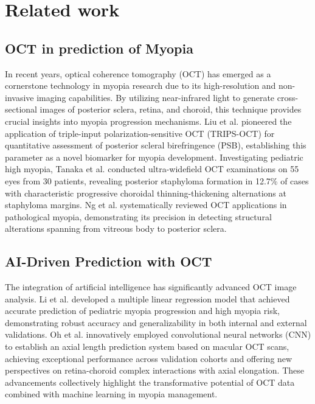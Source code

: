 \documentclass[AMA,Times1COL]{WileyNJDv5} %
\begin{document}
\section{Related work}
\subsection{OCT in prediction of Myopia}
In recent years, optical coherence tomography (OCT) has emerged as a cornerstone technology in myopia research due to its high-resolution and non-invasive imaging capabilities. By utilizing near-infrared light to generate cross-sectional images of posterior sclera, retina, and choroid, this technique provides crucial insights into myopia progression mechanisms\cite{zuo2025machine}. Liu et al. \cite{liu2023posterior} pioneered the application of triple-input polarization-sensitive OCT (TRIPS-OCT) for quantitative assessment of posterior scleral birefringence (PSB), establishing this parameter as a novel biomarker for myopia development. Investigating pediatric high myopia, Tanaka et al.\cite{tanaka2019posterior} conducted ultra-widefield OCT examinations on 55 eyes from 30 patients, revealing posterior staphyloma formation in 12.7\% of cases with characteristic progressive choroidal thinning-thickening alternations at staphyloma margins. Ng et al. \cite{ng2016advances} systematically reviewed OCT applications in pathological myopia, demonstrating its precision in detecting structural alterations spanning from vitreous body to posterior sclera.
\subsection{AI-Driven Prediction with OCT}
The integration of artificial intelligence has significantly advanced OCT image analysis\cite{zuo2025machine}. Li et al. \cite{li2024accurate} developed a multiple linear regression model that achieved accurate prediction of pediatric myopia progression and high myopia risk, demonstrating robust accuracy and generalizability in both internal and external validations. Oh et al. \cite{oh2024prediction} innovatively employed convolutional neural networks (CNN) to establish an axial length prediction system based on macular OCT scans, achieving exceptional performance across validation cohorts and offering new perspectives on retina-choroid complex interactions with axial elongation. These advancements collectively highlight the transformative potential of OCT data combined with machine learning in myopia management.
\end{document}
